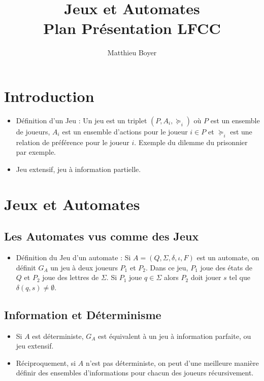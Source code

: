 \documentclass{cours}
\title{Jeux et Automates\\ \small Plan Présentation LFCC}
\author{Matthieu Boyer}
\date{}
\begin{document}
\section*{Introduction}
\begin{itemize}
    \item Définition d'un Jeu : Un jeu est un triplet $\left(P, A_{i}, \succeq_{i}\right)$ où $P$ est un ensemble de joueurs, $A_{i}$ est un ensemble d'actions pour le joueur $i \in P$ et $\succeq_{i}$ est une relation de préférence pour le joueur $i$. Exemple du dilemme du prisonnier par exemple.
    \item Jeu extensif, jeu à information partielle.
\end{itemize}

\section{Jeux et Automates}
\subsection{Les Automates vus comme des Jeux}
\begin{itemize}
    \item Définition du Jeu d'un automate : Si $A = \left(Q, \Sigma, \delta, \iota, F\right)$ est un automate, on définit $G_{A}$ un jeu à deux joueurs $P_{1}$ et $P_{2}$. Dans ce jeu, $P_{1}$ joue des états de $Q$ et $P_{2}$ joue des lettres de $\Sigma$. Si $P_{1}$ joue $q \in \Sigma$ alors $P_{2}$ doit jouer $s$ tel que $\delta(q, s) \neq \emptyset$.
\end{itemize}

\subsection{Information et Déterminisme}
\begin{itemize}
    \item Si $A$ est déterministe, $G_{A}$ est équivalent à un jeu à information parfaite, ou jeu extensif.
    \item Réciproquement, si $A$ n'est pas déterministe, on peut d'une meilleure manière définir des ensembles d'informations pour chacun des joueurs récursivement.
\end{itemize}
\end{document}

